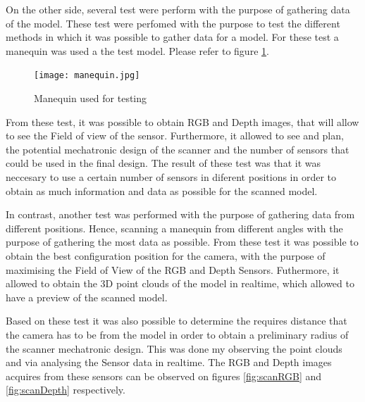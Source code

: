 \documentclass[12pt]{report}
\begin{document}
On the other side, several test were perform with the purpose of gathering data of the model. These test were perfomed with the purpose to test the different methods in which it  was possible to gather data for a model.
For these test a manequin was used a the test model. Please refer to figure \ref{fig:mane}.

\begin{figure}[h]
  \centering
  \texttt{[image: manequin.jpg]}
  \caption{Manequin used for testing}
  \label{fig:mane}
\end{figure}


From these test, it was possible to obtain RGB and Depth images, that will allow to see the Field of view of the sensor. Furthermore, it allowed to see and plan, the potential mechatronic design of the scanner and the number of sensors that could be used in the final design.
The result of these test was that it was neccesary to use a certain number of sensors in diferent positions in order to obtain as much information and data as possible for the scanned model. 

In contrast, another test was performed with the purpose of gathering data from different positions. Hence, scanning a manequin from different angles with the purpose of gathering the most data as possible. 
From these test it was possible to obtain the best configuration position for the camera, with the purpose of maximising the Field of View of the RGB and Depth Sensors.
Futhermore, it allowed to obtain the 3D point clouds of the model in realtime, which allowed to have a preview of the scanned model.  

\newpage
Based on these test it was also possible to determine the requires distance that the camera has to be from the model in order to obtain a preliminary radius of the scanner mechatronic design.
This was done my observing the point clouds and via analysing the Sensor data in realtime. The RGB and Depth images acquires from these sensors can be observed on figures \ref{fig:scanRGB} and \ref{fig:scanDepth} respectively.




\nocite{*}   %


\appendix
\end{document}
